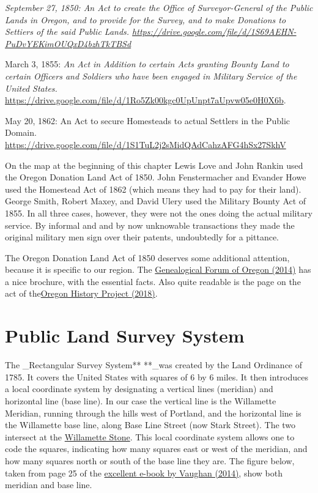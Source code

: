 \documentclass[
  12pt,
]{book}
\begin{document}
\emph{September 27, 1850: An Act to create the Office of Surveyor-General of the Public Lands in Oregon, and to provide for the Survey, and to make Donations to Settiers of the said Public Lands. \url{https://drive.google.com/file/d/1S69AEHN-PuDvYEKimOUQxD4bzhTkTBSd}}

March 3, 1855: \emph{An Act in Addition to certain Acts granting Bounty Land to certain Officers and Soldiers who have been engaged in Military Service of the United States. }\href{https://drive.google.com/file/d/1Ro5Zk00kgc0UpUnpt7aUpvw05e0H0X6b/view}{https://drive.google.com/file/d/1Ro5Zk00kgc0UpUnpt7aUpvw05e0H0X6b}.

May 20, 1862: An Act to secure Homesteads to actual Settlers in the Public Domain. \url{https://drive.google.com/file/d/1S1TuL2j2sMidQAdCahzAFG4hSx27SkhV}

On the map at the beginning of this chapter Lewis Love and John Rankin used the Oregon Donation Land Act of 1850. John Fenstermacher and Evander Howe used the Homestead Act of 1862 (which means they had to pay for their land). George Smith, Robert Maxey, and David Ulery used the Military Bounty Act of 1855. In all three cases, however, they were not the ones doing the actual military service. By informal and and by now unknowable transactions they made the original military men sign over their patents, undoubtedly for a pittance.

The Oregon Donation Land Act of 1850 deserves some additional attention, because it is specific to our region. The \href{https://drive.google.com/file/d/0B94Urj3OjM7BcWhIYmUtV0htcms}{Genealogical Forum of Oregon (2014)} has a nice brochure, with the essential facts. Also quite readable is the page on the act of the\href{https://oregonhistoryproject.org/articles/historical-records/oregon-land-donation-claim-notification/\#.WriRZS-ZPDY}{Oregon History Project (2018)}.

\hypertarget{public-land-survey-system}{%
\section{Public Land Survey System}\label{public-land-survey-system}}

The \_Rectangular Survey System** **\_was created by the Land Ordinance of 1785. It covers the United States with squares of 6 by 6 miles. It then introduces a local coordinate system by designating a vertical lines (meridian) and horizontal line (base line). In our case the vertical line is the Willamette Meridian, running through the hills west of Portland, and the horizontal line is the Willamette base line, along Base Line Street (now Stark Street). The two intersect at the \href{https://en.wikipedia.org/wiki/Willamette_Stone}{Willamette Stone}. This local coordinate system allows one to code the squares, indicating how many squares east or west of the meridian, and how many squares north or south of the base line they are. The figure below, taken from page 25 of the \href{https://www.blm.gov/or/landsrealty/glo200/files/glo-book.pdf}{excellent e-book by Vaughan (2014)}, show both meridian and base line.
\end{document}
